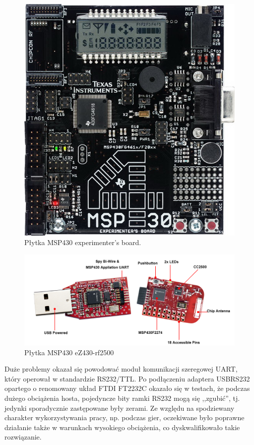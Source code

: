\begin{figure}
 \includegraphics[width=\textwidth]{gfx/exp43000}
 \caption{Płytka MSP430 experimenter's board.}
 \label{fig:msp430_exp}
\end{figure}

\begin{figure}
 \centering
 \includegraphics[width=\textwidth]{gfx/ez430-rf2500}
 \caption{Płytka MSP430 eZ430-rf2500}
 \label{fig:msp430_ez430}
\end{figure}

Duże problemy okazał się powodować moduł komunikacji szeregowej UART, który operował w standardzie RS232/TTL.
Po podłączeniu adaptera USB\ppauza{}RS232 opartego o renomowany układ FTDI FT2232C okazało się w testach, że podczas dużego obciążenia hosta, pojedyncze bity ramki RS232 mogą się ,,zgubić'', tj. jedynki sporadycznie zastępowane były zerami.
Ze względu na spodziewany charakter wykorzystywania pracy, np. podczas gier, oczekiwane było poprawne działanie także w warunkach wysokiego obciążenia, co dyskwalifikowało takie rozwiązanie.\\

